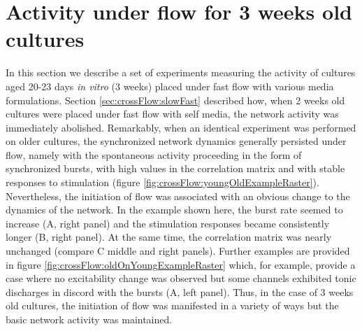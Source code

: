 \section{Activity under flow for 3 weeks old cultures}
\label{sec:crossFlow:oldSelf}
        In this section we describe a set of experiments measuring the activity of cultures aged 20-23 days \textit{in vitro} (3 weeks) placed under fast flow with various media formulations. Section \ref{sec:crossFlow:slowFast} described how, when 2 weeks old cultures were placed under fast flow with self media, the network activity was immediately abolished. Remarkably, when an identical experiment was performed on older cultures, the synchronized network dynamics generally persisted under flow, namely with the spontaneous activity proceeding in the form of synchronized bursts, with high values in the correlation matrix and with stable responses to stimulation (figure \ref{fig:crossFlow:youngOldExampleRaster}). Nevertheless, the initiation of flow was associated with an obvious change to the dynamics of the network. In the example shown here, the burst rate seemed to increase (A, right panel) and the stimulation responses became consistently longer (B, right panel). At the same time, the correlation matrix was nearly unchanged (compare C middle and right panels). Further examples are provided in figure \ref{fig:crossFlow:oldOnYoungExampleRaster} which, for example, provide a case where no excitability change was observed but some channels exhibited tonic discharges in discord with the bursts (A, left panel). Thus, in the case of 3 weeks old cultures, the initiation of flow was manifested in a variety of ways but the basic network activity was maintained.


